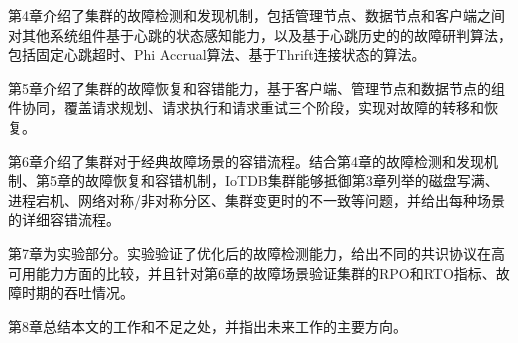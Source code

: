 第4章介绍了集群的故障检测和发现机制，包括管理节点、数据节点和客户端之间对其他系统组件基于心跳的状态感知能力，以及基于心跳历史的的故障研判算法，包括固定心跳超时、Phi Accrual算法、基于Thrift连接状态的算法。

第5章介绍了集群的故障恢复和容错能力，基于客户端、管理节点和数据节点的组件协同，覆盖请求规划、请求执行和请求重试三个阶段，实现对故障的转移和恢复。

第6章介绍了集群对于经典故障场景的容错流程。结合第4章的故障检测和发现机制、第5章的故障恢复和容错机制，IoTDB集群能够抵御第3章列举的磁盘写满、进程宕机、网络对称/非对称分区、集群变更时的不一致等问题，并给出每种场景的详细容错流程。

第7章为实验部分。实验验证了优化后的故障检测能力，给出不同的共识协议在高可用能力方面的比较，并且针对第6章的故障场景验证集群的RPO和RTO指标、故障时期的吞吐情况。

第8章总结本文的工作和不足之处，并指出未来工作的主要方向。